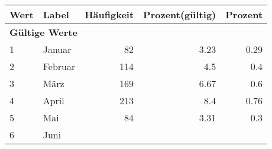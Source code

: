      \begin{longtable}{lXrrr}
     \toprule
     \textbf{Wert} & \textbf{Label} & \textbf{Häufigkeit} & \textbf{Prozent(gültig)} & \textbf{Prozent} \\
     \endhead
     \midrule
     \multicolumn{5}{l}{\textbf{Gültige Werte}}\\

     1 &
     \multicolumn{1}{X}{ Januar   } &


       \num{82} &
       \num[round-mode=places,round-precision=2]{3.23} &
         \num[round-mode=places,round-precision=2]{0.29} \\

     2 &
     \multicolumn{1}{X}{ Februar   } &


       \num{114} &
       \num[round-mode=places,round-precision=2]{4.5} &
         \num[round-mode=places,round-precision=2]{0.4} \\

     3 &
     \multicolumn{1}{X}{ März   } &


       \num{169} &
       \num[round-mode=places,round-precision=2]{6.67} &
         \num[round-mode=places,round-precision=2]{0.6} \\

     4 &
     \multicolumn{1}{X}{ April   } &


       \num{213} &
       \num[round-mode=places,round-precision=2]{8.4} &
         \num[round-mode=places,round-precision=2]{0.76} \\

     5 &
     \multicolumn{1}{X}{ Mai   } &


       \num{84} &
       \num[round-mode=places,round-precision=2]{3.31} &
         \num[round-mode=places,round-precision=2]{0.3} \\

     6 &
     \multicolumn{1}{X}{ Juni   } &



\end{longtable}
